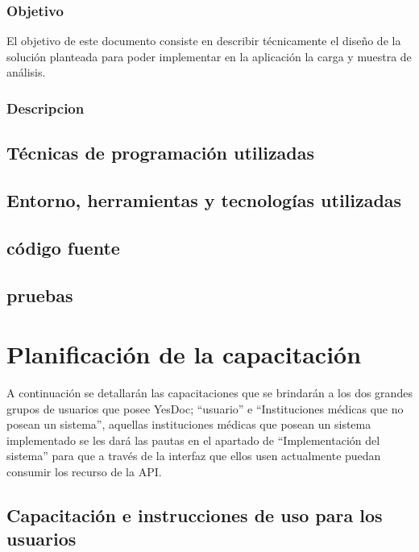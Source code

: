 \documentclass[a4paper,12pt]{article}
\begin{document}
\subsubsection{Objetivo}
El objetivo de este documento consiste en describir técnicamente el diseño de la solución planteada para poder implementar en la aplicación la carga y muestra de análisis.

\subsubsection{Descripcion}%



\subsection{Técnicas de programación utilizadas}
\subsection{Entorno, herramientas y tecnologías utilizadas}
\subsection{código fuente}
\subsection{pruebas}













\section{Planificación de la capacitación}
A continuación se detallarán las capacitaciones que se brindarán a los dos grandes grupos de usuarios que posee YesDoc; ``usuario'' e ``Instituciones médicas que no posean un sistema'', aquellas instituciones médicas que posean un sistema implementado se les dará las pautas en el apartado de ``Implementación del sistema'' para que a través de la interfaz que ellos usen actualmente puedan consumir los recurso de la API.

\subsection{Capacitación e instrucciones de uso para los usuarios}
\end{document}
